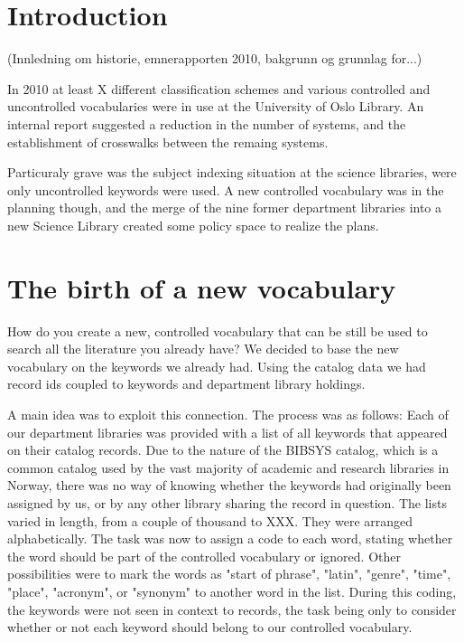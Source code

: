 \section{Introduction}

(Innledning om historie, emnerapporten 2010, bakgrunn og grunnlag for...)

In 2010 at least X different classification schemes and various controlled and uncontrolled vocabularies were in use at the University of Oslo Library. An internal report suggested a reduction in the number of systems, and the establishment of crosswalks between the remaing systems.

Particuraly grave was the subject indexing situation at the science libraries, were only uncontrolled keywords were used. A new controlled vocabulary was in the planning though, and the merge of the nine former department libraries into a new Science Library created some policy space to realize the plans.

\section{The birth of a new vocabulary}

How do you create a new, controlled vocabulary that can be still be used to search all the literature you already have?
We decided to base the new vocabulary on the keywords we already had. Using the catalog data we had record ids coupled to keywords and department library holdings. 

A main idea was to exploit this connection. The process was as follows: Each of our department libraries was provided with a list of all keywords that appeared on their catalog records. Due to the nature of the BIBSYS catalog, which is a common catalog used by the vast majority of academic and research libraries in Norway, there was no way of knowing whether the keywords had originally been assigned by us, or by any other library sharing the record in question. The lists varied in length, from a couple of thousand to XXX. They were arranged alphabetically. The task was now to assign a code to each word, stating whether the word should be part of the controlled vocabulary or ignored. Other possibilities were to mark the words as "start of phrase", "latin", "genre", "time", "place", "acronym", or "synonym" to another word in the list. During this coding, the keywords were not seen in context to records, the task being only to consider whether or not each keyword should belong to our controlled vocabulary. 

